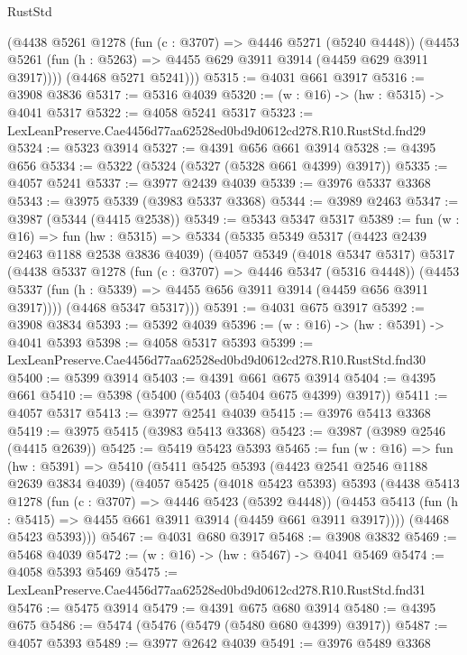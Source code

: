 \begin{lexlean}{RustStd}
\begin{coremodule}
        (@4438
          @5261
          @1278
          (fun (c : @3707) => @4446 @5271 (@5240 @4448))
          (@4453 @5261 (fun (h : @5263) => @4455 @629 @3911 @3914 (@4459 @629 @3911 @3917))))
        (@4468 @5271 @5241)))
@5315 := @4031 @661 @3917
@5316 := @3908 @3836
@5317 := @5316 @4039
@5320 := (w : @16) -> (hw : @5315) -> @4041 @5317
@5322 := @4058 @5241 @5317
@5323 := LexLeanPreserve.Cae4456d77aa62528ed0bd9d0612cd278.R10.RustStd.fnd29
@5324 := @5323 @3914
@5327 := @4391 @656 @661 @3914
@5328 := @4395 @656
@5334 := @5322 (@5324 (@5327 (@5328 @661 @4399) @3917))
@5335 := @4057 @5241
@5337 := @3977 @2439 @4039
@5339 := @3976 @5337 @3368
@5343 := @3975 @5339 (@3983 @5337 @3368)
@5344 := @3989 @2463
@5347 := @3987 (@5344 (@4415 @2538))
@5349 := @5343 @5347 @5317
@5389 := fun (w : @16) =>
  fun (hw : @5315) =>
  @5334
    (@5335
      @5349
      @5317
      (@4423 @2439 @2463 @1188 @2538 @3836 @4039)
      (@4057
        @5349
        (@4018 @5347 @5317)
        @5317
        (@4438
          @5337
          @1278
          (fun (c : @3707) => @4446 @5347 (@5316 @4448))
          (@4453 @5337 (fun (h : @5339) => @4455 @656 @3911 @3914 (@4459 @656 @3911 @3917))))
        (@4468 @5347 @5317)))
@5391 := @4031 @675 @3917
@5392 := @3908 @3834
@5393 := @5392 @4039
@5396 := (w : @16) -> (hw : @5391) -> @4041 @5393
@5398 := @4058 @5317 @5393
@5399 := LexLeanPreserve.Cae4456d77aa62528ed0bd9d0612cd278.R10.RustStd.fnd30
@5400 := @5399 @3914
@5403 := @4391 @661 @675 @3914
@5404 := @4395 @661
@5410 := @5398 (@5400 (@5403 (@5404 @675 @4399) @3917))
@5411 := @4057 @5317
@5413 := @3977 @2541 @4039
@5415 := @3976 @5413 @3368
@5419 := @3975 @5415 (@3983 @5413 @3368)
@5423 := @3987 (@3989 @2546 (@4415 @2639))
@5425 := @5419 @5423 @5393
@5465 := fun (w : @16) =>
  fun (hw : @5391) =>
  @5410
    (@5411
      @5425
      @5393
      (@4423 @2541 @2546 @1188 @2639 @3834 @4039)
      (@4057
        @5425
        (@4018 @5423 @5393)
        @5393
        (@4438
          @5413
          @1278
          (fun (c : @3707) => @4446 @5423 (@5392 @4448))
          (@4453 @5413 (fun (h : @5415) => @4455 @661 @3911 @3914 (@4459 @661 @3911 @3917))))
        (@4468 @5423 @5393)))
@5467 := @4031 @680 @3917
@5468 := @3908 @3832
@5469 := @5468 @4039
@5472 := (w : @16) -> (hw : @5467) -> @4041 @5469
@5474 := @4058 @5393 @5469
@5475 := LexLeanPreserve.Cae4456d77aa62528ed0bd9d0612cd278.R10.RustStd.fnd31
@5476 := @5475 @3914
@5479 := @4391 @675 @680 @3914
@5480 := @4395 @675
@5486 := @5474 (@5476 (@5479 (@5480 @680 @4399) @3917))
@5487 := @4057 @5393
@5489 := @3977 @2642 @4039
@5491 := @3976 @5489 @3368

\end{coremodule}
\end{lexlean}

